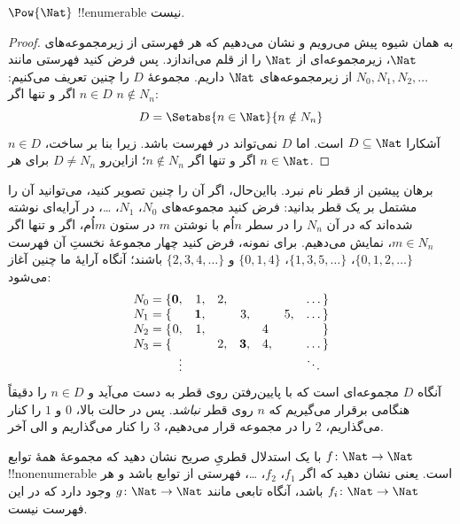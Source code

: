 \documentclass[../../../include/open-logic-section]{subfiles}
\begin{document}
\begin{thm}
$\Pow{\Nat}$ !!{enumerable} نیست.
\end{thm}

\begin{proof}
به همان شیوه پیش می‌رویم و نشان می‌دهیم که هر فهرستی از زیرمجموعه‌های
~$\Nat$، زیرمجموعه‌ای از $\Nat$ را از قلم می‌اندازد. پس فرض کنید فهرستی
مانند $N_0, N_1, N_2, \ldots$ از زیرمجموعه‌های $\Nat$ داریم. مجموعهٔ
$D$ را چنین تعریف می‌کنیم: $n \in D$ اگر و تنها اگر $n \notin N_{n}$:
\[
D = \Setabs{n \in \Nat}{n \notin N_n}
\]
آشکارا $D\subseteq \Nat$ است. اما $D$ نمی‌تواند در فهرست باشد. زیرا بنا بر
ساخت، $n \in D$ اگر و تنها اگر $n\notin N_n$؛ ازاین‌رو $D \neq N_n$
برای هر $n \in \Nat$.
\end{proof}

\begin{explain}
برهان پیشین از قطر نام نبرد. بااین‌حال، اگر آن را چنین تصویر کنید،
می‌توانید آن را مشتمل بر یک قطر بدانید: فرض کنید مجموعه‌های $N_0$،
$N_1$، \dots، در آرایه‌ای نوشته شده‌اند که در آن $N_n$ را در سطر $n$اُم
با نوشتن $m$ در ستون $m$اُم، اگر و تنها اگر $m \in N_n$، نمایش می‌دهیم.
برای نمونه، فرض کنید چهار مجموعهٔ نخستِ آن فهرست
$\{0,1,2,\dots\}$، $\{1, 3, 5, \dots\}$، $\{0,1,4\}$ و
$\{2,3,4,\dots\}$ باشند؛ آنگاه آرایهٔ ما چنین آغاز می‌شود:
\[
\begin{array}{r@{}rrrrrrr}
  N_0 = \{ & \mathbf{0}, & 1, & 2, & & & & \dots\}\\
  N_1 = \{ &  & \mathbf{1}, &  & 3, &  & 5, & \dots\}\\
  N_2 = \{ & 0, & 1, &  &  & 4\phantom{,} &  & \}\\
  N_3 = \{ &  &  & 2, & \mathbf{3}, & 4, & & \dots\}\\
  &\vdots & & & & & & \ddots\phantom{\}}
  \end{array}
\]
آنگاه $D$ مجموعه‌ای است که با پایین‌رفتن روی قطر به دست می‌آید و $n
\in D$ را دقیقاً هنگامی برقرار می‌گیریم که $n$ روی قطر \emph{نباشد}.
پس در حالت بالا، $0$ و $1$ را کنار می‌گذاریم، $2$ را در مجموعه قرار
می‌دهیم، $3$ را کنار می‌گذاریم و الی آخر.
\end{explain}

\begin{prob}
با یک استدلال قطریِ صریح نشان دهید که مجموعهٔ همهٔ توابع
$f \colon \Nat \to \Nat$ !!{nonenumerable} است. یعنی نشان دهید که اگر
$f_1$، $f_2$، \dots، فهرستی از توابع باشد و هر $f_i\colon
\Nat \to \Nat$ باشد، آنگاه تابعی مانند $g \colon \Nat \to
\Nat$ وجود دارد که در این فهرست نیست.
\end{prob}
\end{document}
